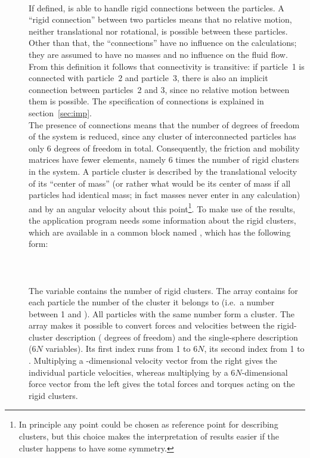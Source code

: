 \begin{description}
\item[]
\\
If defined,  is able to handle
rigid connections between the particles. A ``rigid connection'' between
two particles means that no relative motion, neither translational nor
rotational, is possible between these particles. Other than that, the
``connections'' have no influence on the calculations; they are assumed
to have no masses and no influence on the fluid flow. From this definition it
follows that connectivity is transitive: if particle~1 is connected with
particle~2 and particle~3, there is also an implicit connection between
particles~2 and 3, since no relative motion between them is possible.
The specification of connections is explained in section~\ref{sec:imp}.\\
The presence of connections means that the number of degrees of freedom
of the system is reduced, since any cluster of interconnected particles
has only 6 degrees of freedom in total. Consequently, the friction and
mobility matrices have fewer elements, namely 6 times the number of
rigid clusters in the system. A particle cluster is described by the
translational velocity of its ``center of mass'' (or rather what would
be its center of mass if all particles had identical mass; in fact masses
never enter in any calculation) and by an angular velocity about this
point\footnote{In principle any point could be chosen as reference
point for describing clusters, but this choice makes the interpretation
of results easier if the cluster happens to have some symmetry.}.
To make use of the results, the application program needs some information
about the rigid clusters, which are available in a common block named
, which has the following form:\\
\wsp{}\\
\wsp{}\\
\wsp{}\\
The variable  contains the number of rigid clusters. The
array  contains for each particle the number of the cluster
it belongs to (i.e.\ a number between 1 and ). All particles
with the same number form a cluster. The array  makes it
possible to convert forces and velocities between the rigid-cluster
description ( degrees of freedom) and the single-sphere
description (6$N$ variables). Its first index runs from 1 to $6N$, its
second index from 1 to . Multiplying a -dimensional
velocity vector from the right gives the individual particle velocities,
whereas multiplying by a 6$N$-dimensional force vector from the left gives
the total forces and torques acting on the rigid clusters.\\


\end{description}
